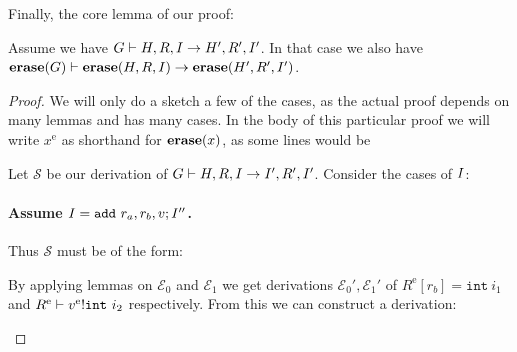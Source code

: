 Finally, the core lemma of our proof:

\begin{lemma}
  \label{lemma:erasestep}
  Assume we have
  $\execis{\high G}{\high H, \high R, \high I}{\high H', \high R', \high
    I'}$. In that case we also have
  $\execis{\erase(\high G)}{\erase(\high H, \high R, \high I)}{\erase(\high H',
    \high R', \high I')}$.
\end{lemma}
\begin{proof}
  We will only do a sketch a few of the cases, as the actual proof depends on
  many lemmas and has many cases. In the body of this particular proof we will
  write $x^{\mathrm{e}}$ as shorthand for $\erase(x)$, as some lines would be

  Let $\mathcal{S}$ be our derivation of
  $\execis{\high G}{\high H, \high R, \high I}{\high I', \high R', \high
    I'}$. Consider the cases of $\high I$:

  \paragraph{Assume $\high I = \mathtt{add}\ r_a, r_b, \high v ; \high I''$.}
  Thus $\mathcal{S}$ must be of the form:

  \begin{mathpar}
  \end{mathpar}

  By applying lemmas on $\mathcal{E}_0$ and $\mathcal{E}_1$ we get derivations
  $\mathcal{E}_0', \mathcal{E}_1'$ of $R^{\mathrm{e}}[r_b] = \mathtt{int}\ i_1$ and
  $\evalregs{\high R^{\mathrm{e}}}{\high v^{\mathrm{e}}}{\mathtt{int}\ i_2}$ respectively. From this
  we can construct a derivation:

  \begin{mathpar}
  \end{mathpar}


\end{proof}

